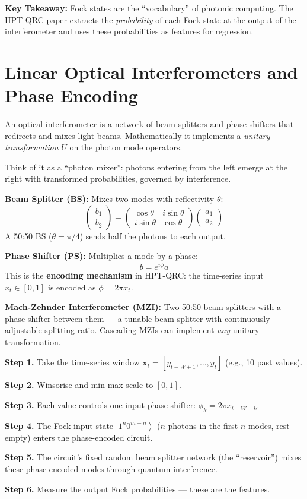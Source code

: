 \documentclass[11pt]{article}
\newcommand{\concept}[2]{%
  \begin{tcolorbox}[conceptbox, title={#1}]
  #2
  \end{tcolorbox}
}
\newcommand{\mathblock}[2]{%
  \begin{tcolorbox}[mathbox, title={Math: #1}]
  #2
  \end{tcolorbox}
}
\newcommand{\keypoint}[1]{%
  \begin{tcolorbox}[keybox]
  \textbf{Key Takeaway:} #1
  \end{tcolorbox}
}
\providecommand{\ket}[1]{\left| #1 \right\rangle}
\begin{document}
\keypoint{Fock states are the ``vocabulary'' of photonic computing.
The HPT-QRC paper extracts the \emph{probability} of each Fock state
at the output of the interferometer and uses these probabilities as
features for regression.}

\section{Linear Optical Interferometers and Phase Encoding}

\concept{What is a Photonic Interferometer?}{
An optical interferometer is a network of beam splitters and phase shifters
that redirects and mixes light beams. Mathematically it implements a
\emph{unitary transformation} $U$ on the photon mode operators.

Think of it as a ``photon mixer'': photons entering from the left emerge
at the right with transformed probabilities, governed by interference.
}

\mathblock{Building Blocks}{
\textbf{Beam Splitter (BS):} Mixes two modes with reflectivity $\theta$:
\[
  \begin{pmatrix} b_1 \\ b_2 \end{pmatrix}
  = \begin{pmatrix} \cos\theta & i\sin\theta \\ i\sin\theta & \cos\theta
    \end{pmatrix}
  \begin{pmatrix} a_1 \\ a_2 \end{pmatrix}
\]
A 50:50 BS ($\theta = \pi/4$) sends half the photons to each output.

\textbf{Phase Shifter (PS):} Multiplies a mode by a phase:
\[
  b = e^{i\phi} a
\]
This is the \textbf{encoding mechanism} in HPT-QRC: the time-series
input $x_t \in [0,1]$ is encoded as $\phi = 2\pi x_t$.

\textbf{Mach-Zehnder Interferometer (MZI):}
Two 50:50 beam splitters with a phase shifter between them --- a
tunable beam splitter with continuously adjustable splitting ratio.
Cascading MZIs can implement \emph{any} unitary transformation.
}

\concept{How Input Is Encoded into the Circuit}{
\textbf{Step 1.} Take the time-series window
$\mathbf{x}_t = [y_{t-W+1}, \ldots, y_t]$ (e.g., 10 past values).

\textbf{Step 2.} Winsorise and min-max scale to $[0,1]$.

\textbf{Step 3.} Each value controls one input phase shifter:
$\phi_k = 2\pi x_{t-W+k}$.

\textbf{Step 4.} The Fock input state $\ket{1^n 0^{m-n}}$
($n$ photons in the first $n$ modes, rest empty) enters the phase-encoded circuit.

\textbf{Step 5.} The circuit's fixed random beam splitter network
(the ``reservoir'') mixes these phase-encoded modes through
quantum interference.

\textbf{Step 6.} Measure the output Fock probabilities --- these are the features.
}
\end{document}

